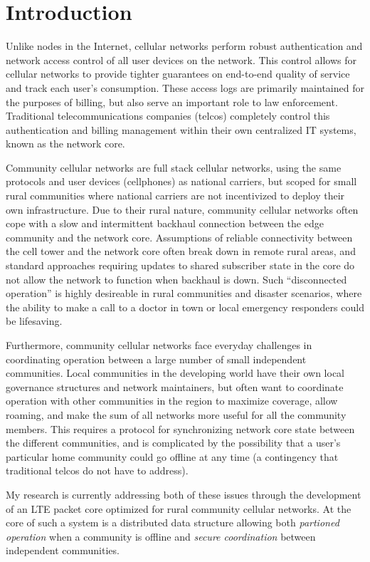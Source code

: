 \section{Introduction}

Unlike nodes in the Internet, cellular networks perform robust
authentication and network access control of all user devices on the
network. This control allows for cellular networks to provide tighter
guarantees on end-to-end quality of service and track each user's
consumption. These access logs are primarily maintained for the
purposes of billing, but also serve an important role to law
enforcement. Traditional telecommunications companies (telcos)
completely control this authentication and billing management within
their own centralized IT systems, known as the network core.

Community cellular networks are full stack cellular networks, using
the same protocols and user devices (cellphones) as national carriers,
but scoped for small rural communities where national carriers are not
incentivized to deploy their own
infrastructure.\cite{Heimerllongitudinalstudylocal2015} Due to their
rural nature, community cellular networks often cope with a slow and
intermittent backhaul connection between the edge community and the
network core. Assumptions of reliable connectivity between the cell
tower and the network core often break down in remote rural areas, and
standard approaches requiring updates to shared subscriber state in
the core do not allow the network to function when backhaul is down.
Such ``disconnected operation'' is highly desireable in rural
communities and disaster scenarios, where the ability to make a call
to a doctor in town or local emergency responders could be lifesaving.

Furthermore, community cellular networks face everyday challenges in
coordinating operation between a large number of small independent
communities. Local communities in the developing world have their own
local governance structures and network maintainers, but often want to
coordinate operation with other communities in the region to maximize
coverage, allow roaming, and make the sum of all networks more useful
for all the community members. This requires a protocol for
synchronizing network core state between the different communities,
and is complicated by the possibility that a user's particular home
community could go offline at any time (a contingency that traditional
telcos do not have to address).

My research is currently addressing both of these issues through the
development of an LTE packet core optimized for rural community
cellular networks. At the core of such a system is a distributed data
structure allowing both \emph{partioned operation} when a community is
offline and \emph{secure coordination} between independent communities.

